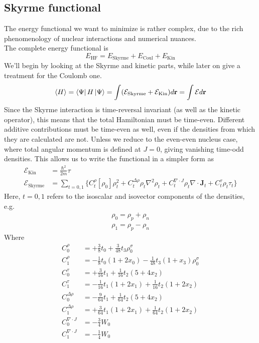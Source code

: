 \subsection{Skyrme functional}
The energy functional we want to minimize is rather complex, due to the rich phenomenology of nuclear interactions and numerical nuances.
\\The complete energy functional is
\begin{equation}
\label{eq:full_functional}
E_{\text{HF}} = E_\text{Skyrme}+E_\text{Coul} + E_\text{Kin}
\end{equation}
We'll begin by looking at the Skyrme and kinetic parts, while later on give a treatment for the Coulomb one.
\begin{equation}
    \label{eq:slater_exp}
    \expval{H} = \bra{\Psi} H \ket{\Psi} = \int (\mathcal E_\text{Skyrme} + \mathcal E_\text{Kin}) d\mathbf r = \int \mathcal E d\mathbf r
\end{equation}
Since the Skyrme interaction is time-reversal invariant (as well as the kinetic operator), this means that the total Hamiltonian must be time-even.
Different additive contributions must be time-even as well, even if the densities from which they are calculated are not. Unless we reduce to the even-even nucleus case, where total angular momentum is defined at $J=0$, giving vanishing time-odd densities.
This allows us to write the functional in a simpler form as \cite{stevenson2019low}
\begin{align}
    \mathcal E_\text{Kin} &= \frac{\hbar^2}{2m}\tau \label{eq:kinfunc}\\
    \mathcal E_\text{Skyrme} &= \sum_{t=0,1}\bigg\{C_t^\rho [\rho_0]\rho_t^2+C_t^{\Delta \rho}\rho_t\nabla^2\rho_t+C_t^{\nabla\cdot J}\rho_t\nabla\cdot \mathbf J_t + C_t^\tau\rho_t\tau_t\bigg\}\label{eq:skfunc}
\end{align}
Here, $t=0,1$ refers to the isoscalar and isovector components of the densities, e.g.
\begin{align*}
    \rho_0 = \rho_p + \rho_n
    \\\rho_1 = \rho_p - \rho_n
\end{align*}
Where
\begin{align}
    \label{eq:coefficients_func}
    C_0^\rho &= +\frac 3 8 t_0 + \frac 3 {48} t_3\rho_0^\sigma 
    \\C_1^\rho &= -\frac 1 8 t_0(1+2x_0)- \frac 1 {48} t_3(1+x_3)\rho_0^\sigma 
    \\C_0^\tau &= +\frac 3 {16} t_1 + \frac 1 {16} t_2 (5+4x_2)
    \\C_1^\tau &= -\frac 1 {16} t_1(1+2x_1)+\frac 1 {16}t_2(1+2x_2)
    \\C_0^{\Delta \rho} &= -\frac 9 {64}t_1+\frac 1 {64}t_2(5+4x_2)
    \\C_1^{\Delta \rho} &= +\frac 3 {64}t_1(1+2x_1)+\frac 1 {64}t_2(1+2x_2)
    \\C_0^{\nabla\cdot J} &= -\frac 3 4 W_0
    \\C_1^{\nabla\cdot J} &= -\frac 1 4 W_0
\end{align}
